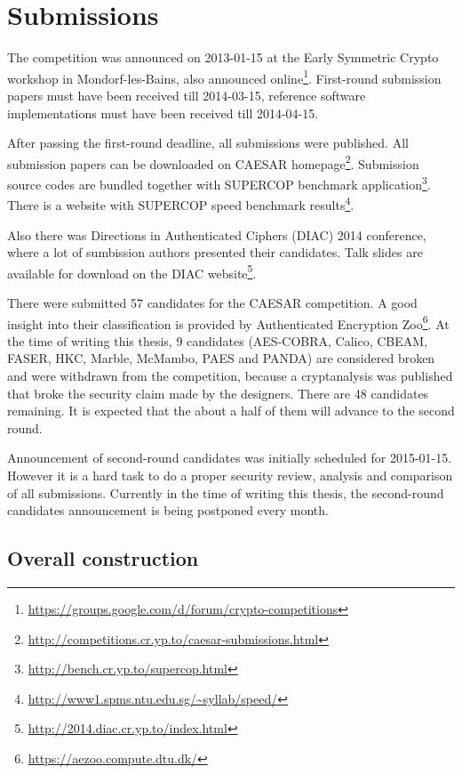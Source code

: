 \section{Submissions}

The competition was announced on 2013-01-15 at the Early Symmetric Crypto workshop in Mondorf-les-Bains, also announced online\footnote{\url{https://groups.google.com/d/forum/crypto-competitions}}. First-round submission papers must have been received till 2014-03-15, reference software implementations must have been received till 2014-04-15.

After passing the first-round deadline, all submissions were published. All submission papers can be downloaded on CAESAR homepage\footnote{\url{http://competitions.cr.yp.to/caesar-submissions.html}}. Submission source codes are bundled together with SUPERCOP benchmark application\footnote{\url{http://bench.cr.yp.to/supercop.html}}. There is a website with SUPERCOP speed benchmark results\footnote{\url{http://www1.spms.ntu.edu.sg/~syllab/speed/}}.

Also there was Directions in Authenticated Ciphers (DIAC) 2014 conference, where a lot of sumbission authors presented their candidates. Talk slides are available for download on the DIAC website\footnote{\url{http://2014.diac.cr.yp.to/index.html}}.

There were submitted 57 candidates for the CAESAR competition. A good insight into their classification is provided by Authenticated Encryption Zoo\footnote{\url{https://aezoo.compute.dtu.dk/}}. At the time of writing this thesis, 9 candidates (AES-COBRA, Calico, CBEAM, FASER, HKC, Marble, McMambo, PAES and PANDA) are considered broken and were withdrawn from the competition, because a cryptanalysis was published that broke the security claim made by the designers. \cite{cryptoeprint:2014:792} There are 48 candidates remaining. It is expected that the about a half of them will advance to the second round.

Announcement of second-round candidates was initially scheduled for 2015-01-15. However it is a hard task to do a proper security review, analysis and comparison of all submissions. Currently in the time of writing this thesis, the second-round candidates announcement is being postponed every month.


\subsection{Overall construction}

